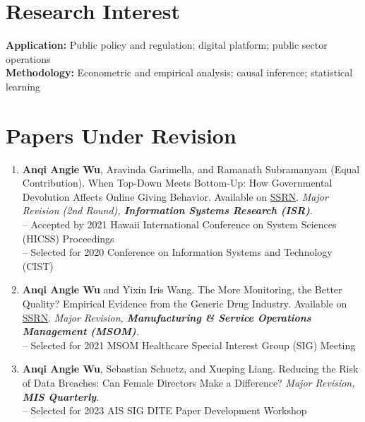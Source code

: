 \documentclass[margin,line]{resume}
\begin{document}
\begin{resume}

    \section{\mysidestyle Research Interest}
    \textbf{Application:} Public policy and regulation; digital platform; public sector operations\\
    \textbf{Methodology:} Econometric and empirical analysis; causal inference; statistical learning
    
    
 	  \section{\mysidestyle Papers Under Revision} 
 	  \begin{enumerate}[topsep=0pt, leftmargin=*]
 	  
 	   	 \item \textbf{Anqi Angie Wu}, Aravinda Garimella, and Ramanath Subramanyam (Equal Contribution). When Top-Down Meets Bottom-Up: How Governmental Devolution Affects Online Giving Behavior. Available on \href{https://papers.ssrn.com/abstract=3779413}{{SSRN}}. \textit{Major Revision (2nd Round), \textbf{Information Systems Research (ISR)}}.\\	     [0.3em]
 	     -- Accepted by 2021 Hawaii International Conference on System Sciences (HICSS) Proceedings\\ 
 	     -- Selected for 2020 Conference on Information Systems and Technology (CIST) \\[-0.5em]
 	     
 	     \item \textbf{Anqi Angie Wu} and Yixin Iris Wang. The More Monitoring, the Better Quality? Empirical Evidence from the Generic Drug Industry. Available on \href{https://papers.ssrn.com/abstract=3596559}{{SSRN}}. \textit{Major Revision, \textbf{Manufacturing \& Service Operations Management (MSOM)}. }\\[0.3em]
 	     -- Selected for 2021 MSOM Healthcare Special Interest Group (SIG) Meeting\\[-0.5em]

       \item \textbf{Anqi Angie Wu}, Sebastian Schuetz, and Xueping Liang. Reducing the Risk of Data Breaches: Can Female Directors Make a Difference? \textit{Major Revision, \textbf{MIS Quarterly}}.\\[0.3em]
       -- Selected for 2023 AIS SIG DITE Paper Development Workshop\\[-0.5em]  
       

\end{enumerate}
\end{resume}
\end{document}
